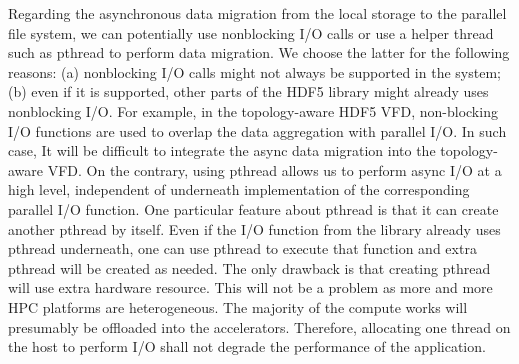 \documentclass[aps, rmp, 11pt, notitlepage]{revtex4-1}
\begin{document}
Regarding the asynchronous data migration from the local storage to the parallel file system, we can potentially use nonblocking I/O calls or use a helper thread such as pthread to perform data migration. We choose the latter for the following reasons: (a) nonblocking I/O calls might not always be supported in the system; (b) even if it is supported, other parts of the HDF5 library might already uses nonblocking I/O. For example, in the topology-aware HDF5 VFD, non-blocking I/O functions are used to overlap the data aggregation with parallel I/O. In such case, It will be difficult to integrate the async data migration into the topology-aware VFD. On the contrary, using pthread allows us to perform async I/O at a high level, independent of underneath implementation of the corresponding parallel I/O function. One particular feature about pthread is that it can create another pthread by itself. Even if the I/O function from the library already uses pthread underneath, one can use pthread to execute that function and extra pthread will be created as needed. The only drawback is that creating pthread will use extra hardware resource. This will not be a problem as more and more HPC platforms are heterogeneous. The majority of the compute works will presumably be offloaded into the accelerators. Therefore, allocating one thread on the host to perform I/O shall not degrade the performance of the application. 
\end{document}
